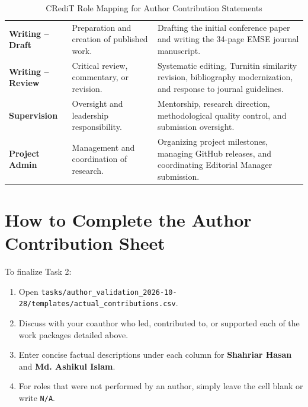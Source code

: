 \documentclass[11pt,a4paper]{article}
\begin{document}
\begin{table}[ht]
\begin{tabularx}{\linewidth}{l p{4cm} X}
\addlinespace
\textbf{Writing -- Draft} & Preparation and creation of published work. & Drafting the initial conference paper and writing the 34-page EMSE journal manuscript. \\
\addlinespace
\textbf{Writing -- Review} & Critical review, commentary, or revision. & Systematic editing, Turnitin similarity revision, bibliography modernization, and response to journal guidelines. \\
\addlinespace
\textbf{Supervision} & Oversight and leadership responsibility. & Mentorship, research direction, methodological quality control, and submission oversight. \\
\addlinespace
\textbf{Project Admin} & Management and coordination of research. & Organizing project milestones, managing GitHub releases, and coordinating Editorial Manager submission. \\
\bottomrule
\end{tabularx}
\caption{CRediT Role Mapping for Author Contribution Statements}
\end{table}

\section{How to Complete the Author Contribution Sheet}

To finalize Task 2:
\begin{enumerate}
  \item Open \nolinkurl{tasks/author_validation_2026-10-28/templates/actual_contributions.csv}.
  \item Discuss with your coauthor who led, contributed to, or supported each of the work packages detailed above.
  \item Enter concise factual descriptions under each column for \textbf{Shahriar Hasan} and \textbf{Md. Ashikul Islam}.
  \item For roles that were not performed by an author, simply leave the cell blank or write \texttt{N/A}.
\end{enumerate}
\end{document}
